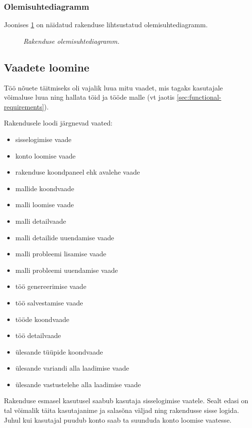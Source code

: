 \subsubsection{Olemisuhtediagramm}

Joonises \ref{fig:uml} on näidatud rakenduse lihtsustatud olemisuhtediagramm.

\begin{figure}
\begin{adjustbox}{width=\textwidth}

\end{adjustbox}
\caption{\emph{Rakenduse olemisuhtediagramm.}}\label{fig:uml}
\end{figure}

\subsection{Vaadete loomine}

Töö nõuete täitmiseks oli vajalik luua mitu vaadet, mis tagaks kasutajale võimaluse luua ning hallata töid ja tööde malle (vt jaotis \ref{sec:functional-requirements}).

Rakendusele loodi järgnevad vaated:
\begin{itemize}
  \item sisselogimise vaade
  \item konto loomise vaade
  \item rakenduse koondpaneel ehk avalehe vaade
  \item mallide koondvaade
  \item malli loomise vaade
  \item malli detailvaade
  \item malli detailide uuendamise vaade
  \item malli probleemi lisamise vaade
  \item malli probleemi uuendamise vaade
  \item töö genereerimise vaade
  \item töö salvestamise vaade
  \item tööde koondvaade
  \item töö detailvaade
  \item ülesande tüüpide koondvaade
  \item ülesande variandi alla laadimise vaade
  \item ülesande vastustelehe alla laadimise vaade
\end{itemize}

Rakenduse esmasel kasutusel saabub kasutaja sisselogimise vaatele. Sealt edasi on tal võimalik täita kasutajanime ja salasõna väljad ning rakendusse sisse logida. Juhul kui kasutajal puudub konto saab ta suunduda konto loomise vaatesse.

